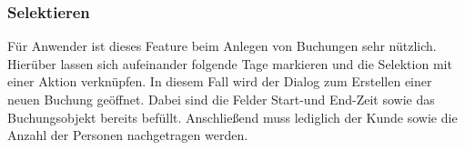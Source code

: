 \subsubsection{Selektieren}
Für Anwender ist dieses Feature beim Anlegen von Buchungen sehr nützlich. Hierüber lassen sich aufeinander folgende Tage markieren und die Selektion mit einer Aktion verknüpfen.
In diesem Fall wird der Dialog zum Erstellen einer neuen Buchung geöffnet.
Dabei sind die Felder Start-und End-Zeit sowie das Buchungsobjekt bereits befüllt. Anschließend muss lediglich der Kunde sowie die Anzahl der Personen nachgetragen werden.